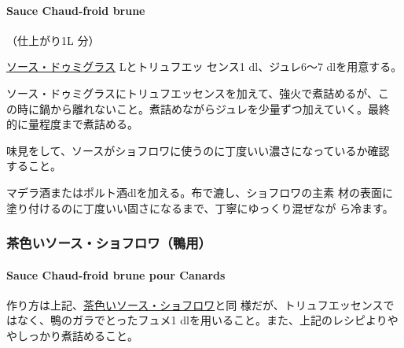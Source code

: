 \hypertarget{sauce-chaud-froid-brune}{%
\paragraph{Sauce Chaud-froid brune}\label{sauce-chaud-froid-brune}}


（仕上がり1L 分）

\protect\hyperlink{sauce-demi-glace}{ソース・ドゥミグラス}\troisquarts{}
Lとトリュフエッ センス1 dl、ジュレ6〜7 dlを用意する。

ソース・ドゥミグラスにトリュフエッセンスを加えて、強火で煮詰めるが、こ
の時に鍋から離れないこと。煮詰めながらジュレを少量ずつ加えていく。最終
的に\deuxtiers{}量程度まで煮詰める。

味見をして、ソースがショフロワに使うのに丁度いい濃さになっているか確認
すること。

マデラ酒またはポルト酒\undemi{}dlを加える。布で漉し、ショフロワの主素
材の表面に塗り付けるのに丁度いい固さになるまで、丁寧にゆっくり混ぜなが
ら冷ます。

\maeaki

\hypertarget{ux8336ux8272ux3044ux30bdux30fcux30b9ux30b7ux30e7ux30d5ux30edux30efux9d28ux7528}{%
\subsubsection{茶色いソース・ショフロワ（鴨用）}\label{ux8336ux8272ux3044ux30bdux30fcux30b9ux30b7ux30e7ux30d5ux30edux30efux9d28ux7528}}

\hypertarget{sauce-chaud-froid-brune-pour-canards}{%
\paragraph{Sauce Chaud-froid brune pour
Canards}\label{sauce-chaud-froid-brune-pour-canards}}

  

作り方は上記、\protect\hyperlink{sauce-chaud-froid-brune}{茶色いソース・ショフロワ}と同
様だが、トリュフエッセンスではなく、鴨のガラでとったフュメ1\undemi{}
dlを用いること。また、上記のレシピよりややしっかり煮詰めること。

